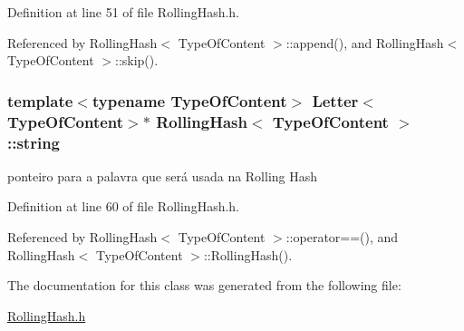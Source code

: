 Definition at line 51 of file Rolling\+Hash.\+h.



Referenced by Rolling\+Hash$<$ Type\+Of\+Content $>$\+::append(), and Rolling\+Hash$<$ Type\+Of\+Content $>$\+::skip().

\hypertarget{classRollingHash_af85ff74e2d593d4bc48a9c73732d18ec}{
\subsubsection[{string}]{\setlength{\rightskip}{0pt plus 5cm}template$<$typename Type\+Of\+Content$>$ {\bf Letter}$<$Type\+Of\+Content$>$$\ast$ {\bf Rolling\+Hash}$<$ Type\+Of\+Content $>$\+::{\bf string}}}\label{classRollingHash_af85ff74e2d593d4bc48a9c73732d18ec}


ponteiro para a palavra que será usada na Rolling Hash 



Definition at line 60 of file Rolling\+Hash.\+h.



Referenced by Rolling\+Hash$<$ Type\+Of\+Content $>$\+::operator==(), and Rolling\+Hash$<$ Type\+Of\+Content $>$\+::\+Rolling\+Hash().



The documentation for this class was generated from the following file\+:\begin{DoxyCompactItemize}
\item 
\hyperlink{RollingHash_8h}{Rolling\+Hash.\+h}\end{DoxyCompactItemize}
